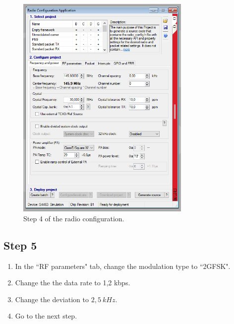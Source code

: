 \documentclass[12pt]{book}
\begin{document}
\begin{appendices}
\begin{figure}[!h]
	\begin{center}
		\includegraphics[width=0.75\textwidth]{figures/wds-tutorial-4.png}
		\caption{Step 4 of the radio configuration.}
		\label{fig:wds-tutorial-step-4}
	\end{center}
\end{figure}

\subsection{Step 5}

\begin{enumerate}
    \item In the ``RF parameters" tab, change the modulation type to ``2GFSK".
    \item Change the the data rate to 1,2 kbps.
    \item Change the deviation to $2,5\ kHz$.
    \item Go to the next step.
\end{enumerate}


\end{appendices}
\end{document}
